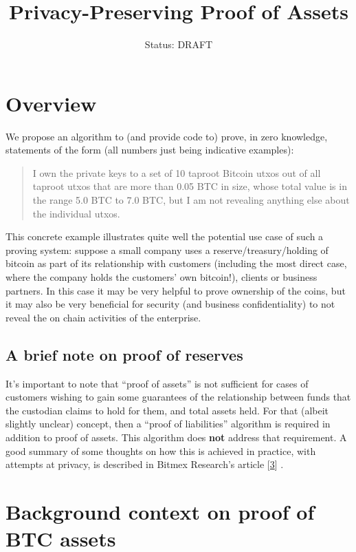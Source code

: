 \documentclass[10pt,a4paper]{article}
\author{Status: DRAFT}
\begin{document}
\title{Privacy-Preserving Proof of Assets}
\maketitle


\section{Overview}

We propose an algorithm to (and provide code to) prove, in zero knowledge, statements of the form (all numbers just being indicative examples):

\begin{quote}
I own the private keys to a set of 10 taproot Bitcoin utxos out of all taproot utxos that are more than 0.05 BTC in size, whose total value is in the range 5.0 BTC to 7.0 BTC, but I am not revealing anything else about the individual utxos.
\end{quote}

This concrete example illustrates quite well the potential use case of such a proving system: suppose a small company uses a reserve/treasury/holding of bitcoin as part of its relationship with customers (including the most direct case, where the company holds the customers' own bitcoin!), clients or business partners. In this case it may be very helpful to prove ownership of the coins, but it may also be very beneficial for security (and business confidentiality) to not reveal the on chain activities of the enterprise.

\subsection{A brief note on proof of reserves}

It's important to note that ``proof of assets'' is not sufficient for cases of customers wishing to gain some guarantees of the relationship between funds that the custodian claims to hold for them, and total assets held. For that (albeit slightly unclear) concept, then a ``proof of liabilities'' algorithm is required in addition to proof of assets. This algorithm does \textbf{not} address that requirement. A good summary of some thoughts on how this is achieved in practice, with attempts at privacy, is described in Bitmex Research's article {[}\protect\hyperlink{anchor-3}{3}{]} .

\vspace{5 pt}

\section{Background context on proof of BTC assets}
\end{document}
